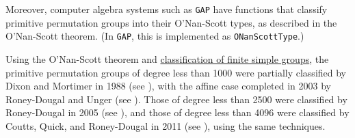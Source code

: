 {    Moreover, computer algebra systems such as \texttt{GAP} have functions that classify primitive permutation groups into their O'Nan-Scott types, as described in the O'Nan-Scott theorem. (In \texttt{GAP}, this is implemented as \texttt{ONanScottType}.)

    Using the O'Nan-Scott theorem and \hyperref[thm:cfsg]{classification of finite simple groups}, the primitive permutation groups of degree less than 1000 were partially classified by Dixon and Mortimer in 1988 (see \cite{dixon1988}), with the affine case completed in 2003 by Roney-Dougal and Unger (see \cite{roney-dougal2003}). Those of degree less than 2500 were classified by Roney-Dougal in 2005 (see \cite{roney-dougal2005}), and those of degree less than 4096 were classified by Coutts, Quick, and Roney-Dougal in 2011 (see \cite{coutts2011}), using the same techniques.}